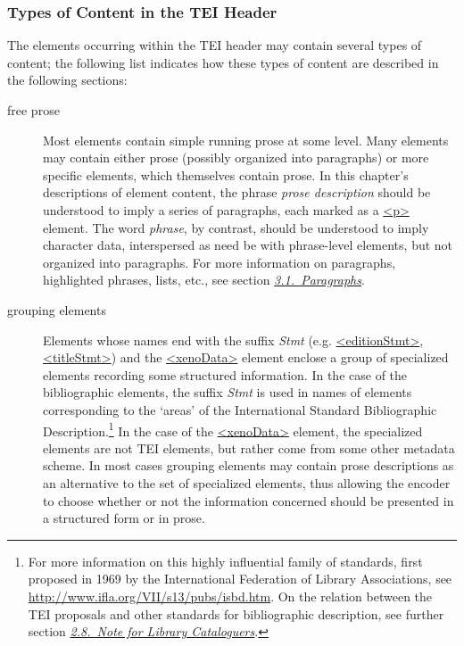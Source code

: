 \subsubsection[{Types of Content in the TEI Header}]{Types of Content in the TEI Header}\label{HD12}\par
The elements occurring within the TEI header may contain several types of content; the following list indicates how these types of content are described in the following sections: \begin{description}

\item[{free prose}]Most elements contain simple running prose at some level. Many elements may contain either prose (possibly organized into paragraphs) or more specific elements, which themselves contain prose. In this chapter's descriptions of element content, the phrase \textit{prose description} should be understood to imply a series of paragraphs, each marked as a \hyperref[TEI.p]{<p>} element. The word \textit{phrase}, by contrast, should be understood to imply character data, interspersed as need be with phrase-level elements, but not organized into paragraphs. For more information on paragraphs, highlighted phrases, lists, etc., see section \textit{\hyperref[COPA]{3.1.\ Paragraphs}}.
\item[{grouping elements}]Elements whose names end with the suffix \textit{Stmt} (e.g. \hyperref[TEI.editionStmt]{<editionStmt>}, \hyperref[TEI.titleStmt]{<titleStmt>}) and the \hyperref[TEI.xenoData]{<xenoData>} element enclose a group of specialized elements recording some structured information. In the case of the bibliographic elements, the suffix \textit{Stmt} is used in names of elements corresponding to the ‘areas’ of the International Standard Bibliographic Description.\footnote{For more information on this highly influential family of standards, first proposed in 1969 by the International Federation of Library Associations, see \url{http://www.ifla.org/VII/s13/pubs/isbd.htm}. On the relation between the TEI proposals and other standards for bibliographic description, see further section \textit{\hyperref[HD8]{2.8.\ Note for Library Cataloguers}}.} In the case of the \hyperref[TEI.xenoData]{<xenoData>} element, the specialized elements are not TEI elements, but rather come from some other metadata scheme. In most cases grouping elements may contain prose descriptions as an alternative to the set of specialized elements, thus allowing the encoder to choose whether or not the information concerned should be presented in a structured form or in prose.

\end{description}
